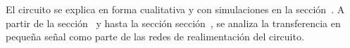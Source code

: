
\vspace{1.5cm}

El circuito se explica en forma cualitativa y con simulaciones en la sección~. A partir de la sección~ y hasta la sección sección~, se analiza la transferencia en pequeña señal como parte de las redes de realimentación del circuito.


\clearpage
